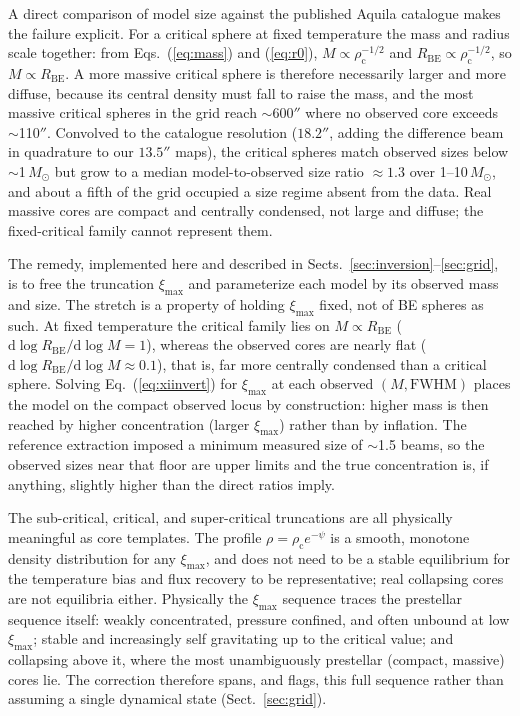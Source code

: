 \documentclass[11pt,a4paper]{article}
\newcommand{\msun}{M_{\odot}}
\newcommand{\rhoc}{\rho_{\mathrm{c}}}
\newcommand{\Rbe}{R_{\mathrm{BE}}}
\newcommand{\ximax}{\xi_{\mathrm{max}}}
\begin{document}
A direct comparison of model size against the published Aquila catalogue makes
the failure explicit. For a critical sphere at fixed temperature the mass and
radius scale together: from Eqs.~(\ref{eq:mass}) and (\ref{eq:r0}),
$M\propto\rhoc^{-1/2}$ and $\Rbe\propto\rhoc^{-1/2}$, so $M\propto\Rbe$. A more
massive critical sphere is therefore necessarily larger and more diffuse,
because its central density must fall to raise the mass, and the most massive
critical spheres in the grid reach $\sim$600$''$ where no observed core exceeds
$\sim$110$''$. Convolved to the catalogue resolution ($18.2''$, adding the
difference beam in quadrature to our $13.5''$ maps), the critical spheres match
observed sizes below $\sim$1\,$\msun$ but grow to a median model-to-observed
size ratio $\approx1.3$ over 1--10\,$\msun$, and about a fifth of the grid
occupied a size regime absent from the data. Real massive cores are compact and
centrally condensed, not large and diffuse; the fixed-critical family cannot
represent them.

The remedy, implemented here and described in
Sects.~\ref{sec:inversion}--\ref{sec:grid}, is to free the truncation $\ximax$
and parameterize each model by its observed mass and size. The stretch is a
property of holding $\ximax$ fixed, not of BE spheres as such. At fixed
temperature the critical family lies on $M\propto\Rbe$
($\mathrm{d}\log\Rbe/\mathrm{d}\log M = 1$), whereas the observed cores are
nearly flat ($\mathrm{d}\log\Rbe/\mathrm{d}\log M \approx 0.1$), that is, far
more centrally condensed than a critical sphere. Solving
Eq.~(\ref{eq:xiinvert}) for $\ximax$ at each observed $(M,\mathrm{FWHM})$ places
the model on the compact observed locus by construction: higher mass is then
reached by higher concentration (larger $\ximax$) rather than by inflation. The
reference extraction imposed a minimum measured size of $\sim$1.5 beams, so the
observed sizes near that floor are upper limits and the true concentration is,
if anything, slightly higher than the direct ratios imply.

The sub-critical, critical, and super-critical truncations are all physically
meaningful as core templates. The profile $\rho=\rhoc e^{-\psi}$ is a smooth,
monotone density distribution for any $\ximax$, and does not need to be a stable
equilibrium for the temperature bias and flux recovery to be representative;
real collapsing cores are not equilibria either. Physically the $\ximax$
sequence traces the prestellar sequence itself: weakly concentrated, pressure
confined, and often unbound at low $\ximax$; stable and increasingly self
gravitating up to the critical value; and collapsing above it, where the most
unambiguously prestellar (compact, massive) cores lie. The correction therefore
spans, and flags, this full sequence rather than assuming a single dynamical
state (Sect.~\ref{sec:grid}).
\end{document}
